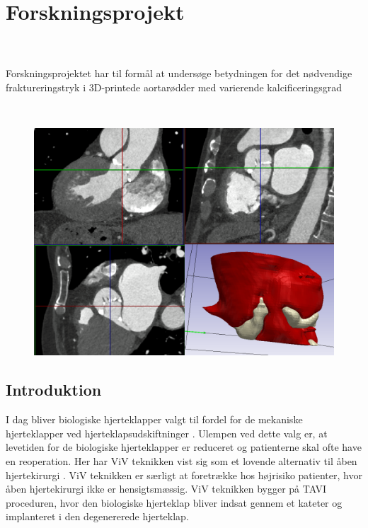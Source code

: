 \chapter{Forskningsprojekt}\label{forskning}

\begin{center}
	~ \\[0.5cm]
	
\noindent\makebox[\linewidth]{\rule{\textwidth}{0.4pt}}\\
[0.5cm]{\LARGE Forskningsprojektet har til formål at undersøge betydningen for det nødvendige fraktureringstryk i 3D-printede aortarødder med varierende kalcificeringsgrad}
\noindent\makebox[\linewidth]{\rule{\textwidth}{0.4pt}}

	~ \\[0.5cm]	


\begin{figure}[H]
	\centering
	\includegraphics[width=1\textwidth]{Figure/forside}
\end{figure} 


\end{center}

\clearpage

\section{Introduktion} 

I dag bliver biologiske hjerteklapper valgt til fordel for de mekaniske hjerteklapper ved hjerteklapsudskiftninger \cite{baggrund10}. Ulempen ved dette valg er, at levetiden for de biologiske hjerteklapper er reduceret og patienterne skal ofte have en reoperation. Her har ViV teknikken vist sig som et lovende alternativ til åben hjertekirurgi \cite{baggrund10}. ViV teknikken er særligt at foretrække hos højrisiko patienter, hvor åben hjertekirurgi ikke er hensigtsmæssig. ViV teknikken bygger på TAVI proceduren, hvor den biologiske hjerteklap bliver indsat gennem et kateter og implanteret i den degenererede hjerteklap.  

